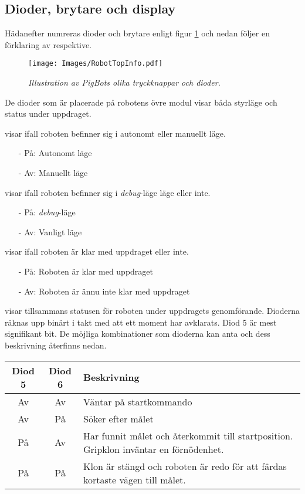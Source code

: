 \documentclass[11pt]{article}
\begin{document}
\subsection{Dioder, brytare och display}
Hädanefter numreras dioder och brytare enligt figur \ref{picTop} och nedan följer en förklaring av respektive.

\begin{figure}[htbp]
	\centering
	\texttt{[image: Images/RobotTopInfo.pdf]}
	\caption{\textit{Illustration av PigBots olika tryckknappar och dioder.} \label{picTop}}
\end{figure}

De dioder som är placerade på robotens övre modul visar båda styrläge och status under uppdraget.
\begin{description}[style=unboxed, leftmargin=0cm]
  \item[Diod 1] visar ifall roboten befinner sig i autonomt eller manuellt läge. 
    \begin{itemize}
      \setlength\itemsep{-0.5em}
      \item[-] På: Autonomt läge 
      \item[-] Av: Manuellt läge
    \end{itemize}
  \item[Diod 2] visar ifall roboten befinner sig i \textit{debug}-läge läge eller inte.
    \begin{itemize}
      \setlength\itemsep{-0.5em}
      \item[-] På: \textit{debug}-läge
      \item[-] Av: Vanligt läge
    \end{itemize}
  \item[Diod 3] visar ifall roboten är klar med uppdraget eller inte.
    \begin{itemize}
      \setlength\itemsep{-0.5em}
      \item[-] På: Roboten är klar med uppdraget
      \item[-] Av: Roboten är ännu inte klar med uppdraget
    \end{itemize}
  \item[Diod 4 och 5] visar tillsammans statusen för roboten under uppdragets genomförande. Dioderna räknas upp binärt i takt med att ett moment har avklarats. Diod 5 är mest signifikant bit. De möjliga kombinationer som dioderna kan anta och dess beskrivning återfinns nedan.

    \hspace{2em}\begin{tabular}{c c p{8cm}}
	Diod 5 & Diod 6 & Beskrivning \\ \hline
	Av & Av & Väntar på startkommando \\
	Av & På & Söker efter målet \\
	På & Av & Har funnit målet och återkommit till startposition. Gripklon inväntar en förnödenhet. \\
	På & På & Klon är stängd och roboten är redo för att färdas kortaste vägen till målet.

    \end{tabular}
\end{description}
\end{document}
